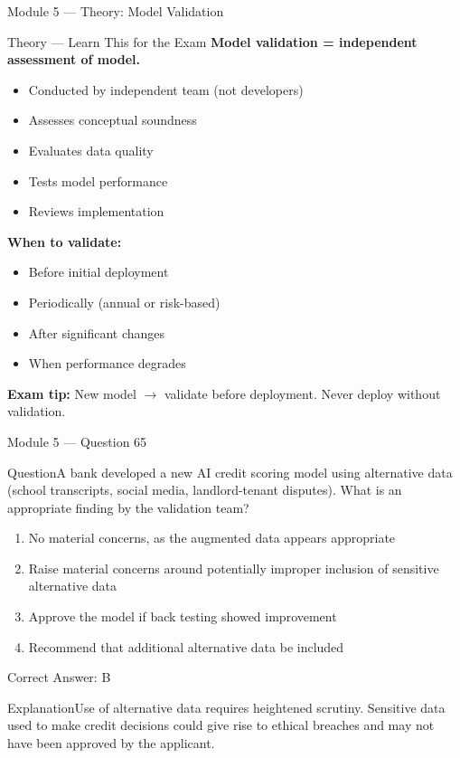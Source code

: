 \documentclass[aspectratio=169,10pt]{beamer}
\newcommand{\question}[1]{\begin{block}{Question}#1\end{block}}
\newcommand{\options}[4]{%
	\begin{enumerate}[label=\Alph*.,leftmargin=*]
		\item #1
		\item #2
		\item #3
		\item #4
	\end{enumerate}
}
\newcommand{\answerbox}[1]{\begin{exampleblock}{Correct Answer: #1}\end{exampleblock}}
\newcommand{\explain}[1]{\begin{block}{Explanation}#1\end{block}}
\newcommand{\theory}[1]{%
	\begin{block}{Theory --- Learn This for the Exam}
		\small #1
	\end{block}
}
\begin{document}
	\begin{frame}{Module 5 --- Theory: Model Validation}
		\theory{
			\textbf{Model validation = independent assessment of model.}
			\begin{itemize}
				\item Conducted by independent team (not developers)
				\item Assesses conceptual soundness
				\item Evaluates data quality
				\item Tests model performance
				\item Reviews implementation
			\end{itemize}
			\textbf{When to validate:}
			\begin{itemize}
				\item Before initial deployment
				\item Periodically (annual or risk-based)
				\item After significant changes
				\item When performance degrades
			\end{itemize}
			\textbf{Exam tip:} New model $\rightarrow$ validate before deployment. Never deploy without validation.
		}
	\end{frame}
	
	\begin{frame}{Module 5 --- Question 65}
		\question{A bank developed a new AI credit scoring model using alternative data (school transcripts, social media, landlord-tenant disputes). What is an appropriate finding by the validation team?}
		\options{No material concerns, as the augmented data appears appropriate}{Raise material concerns around potentially improper inclusion of sensitive alternative data}{Approve the model if back testing showed improvement}{Recommend that additional alternative data be included}
		\answerbox{B}
		\explain{Use of alternative data requires heightened scrutiny. Sensitive data used to make credit decisions could give rise to ethical breaches and may not have been approved by the applicant.}
	\end{frame}
	
\end{document}
